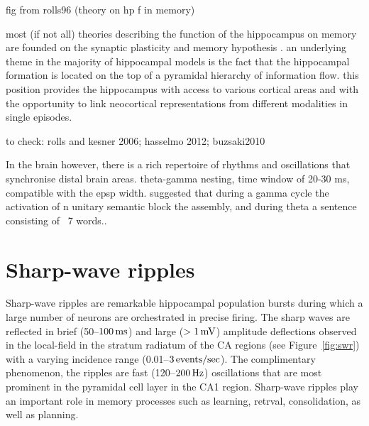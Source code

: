     fig from rolls96 (theory on hp f in memory)

    most (if not all) theories describing the function of the hippocampus on
    memory are founded on the synaptic plasticity and memory hypothesis
    \citep{Martin2000, Takeuchi2014}. an underlying theme in the majority of
    hippocampal models is the fact that the hippocampal formation is located on
    the top of a pyramidal hierarchy of information flow. this position
    provides the hippocampus with access to various cortical areas and with the
    opportunity to link neocortical representations from different modalities
    in single episodes. 

    to check:
    rolls and kesner 2006; hasselmo 2012; buzsaki2010

    In the brain however, there is a rich repertoire of rhythms and oscillations that synchronise
    distal brain areas.  theta-gamma nesting, time window of 20-30 ms, compatible with the epsp width.
    suggested that during a gamma cycle the activation of n unitary semantic block the assembly, and during theta
    a sentence consisting of ~7 words..




\section{Sharp-wave ripples}

  Sharp-wave ripples are remarkable hippocampal population bursts during which
  a large number of neurons are orchestrated in precise firing. The sharp waves
  are reflected in brief (50--$100 \rm\,ms$) and large ($>1 \rm\, mV$)
  amplitude deflections observed in the local-field in the stratum radiatum of
  the CA regions (see Figure~\ref{fig:swr}) with a varying incidence range
  (0.01--$3 \rm \, events/sec$). The complimentary phenomenon, the ripples are
  fast (120--$200 \rm\, Hz$) oscillations that are most prominent in the
  pyramidal cell layer in the CA1 region. Sharp-wave ripples play an important
  role in memory processes such as learning, retrval, consolidation, as well as
  planning.

